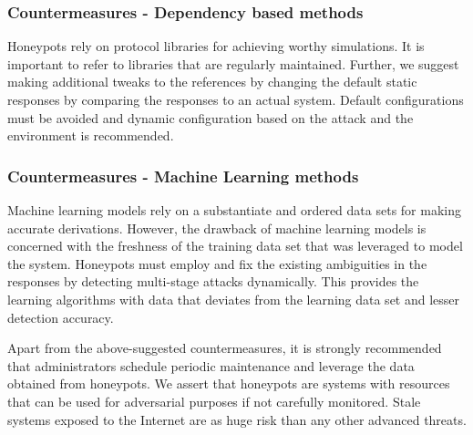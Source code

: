 \subsubsection{Countermeasures - Dependency based methods}
Honeypots rely on protocol libraries for achieving worthy simulations. It is important to refer to libraries that are regularly maintained. Further, we suggest making additional tweaks to the references by changing the default static responses by comparing the responses to an actual system. Default configurations must be avoided and dynamic configuration based on the attack and the environment is recommended. 

\subsubsection{Countermeasures - Machine Learning methods}
Machine learning models rely on a substantiate and ordered data sets for making accurate derivations. However, the drawback of machine learning models is concerned with the freshness of the training data set that was leveraged to model the system. Honeypots must employ and fix the existing ambiguities in the responses by detecting multi-stage attacks dynamically. This provides the learning algorithms with data that deviates from the learning data set and lesser detection accuracy.

Apart from the above-suggested countermeasures, it is strongly recommended that administrators schedule periodic maintenance and leverage the data obtained from honeypots. We assert that honeypots are systems with resources that can be used for adversarial purposes if not carefully monitored. Stale systems exposed to the Internet are as huge risk than any other advanced threats. 

